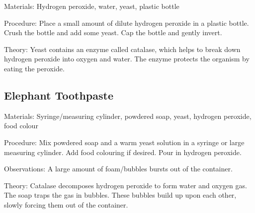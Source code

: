\begin{multicols}{2}

\begin{description*}
\item[Materials:]{Hydrogen peroxide, water, yeast, plastic bottle}
\item[Procedure:]{Place a small amount of dilute hydrogen peroxide in a plastic bottle. Crush the bottle and add some yeast. Cap the bottle and gently invert.}
\item[Theory:]{Yeast contains an enzyme called catalase, which helps to break down hydrogen peroxide into oxygen and water. The enzyme protects the organism by eating the peroxide.}
\end{description*}

\subsection{Elephant Toothpaste}  %


\begin{description*}
\item[Materials:]{Syringe/measuring cylinder, powdered soap, yeast, hydrogen peroxide, food colour}
\item[Procedure:]{Mix powdered soap and a warm yeast solution in a syringe or large measuring cylinder. Add food colouring if desired. Pour in hydrogen peroxide.}
\item[Observations:]{A large amount of foam/bubbles bursts out of the container.}
\item[Theory:]{Catalase decomposes hydrogen peroxide to form water and oxygen
gas. The soap
traps the gas in bubbles. These bubbles build up upon each other, slowly
forcing them out of the container. }
\end{description*}


\end{multicols}
